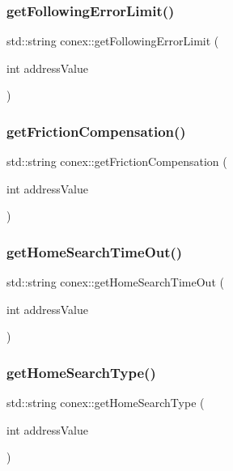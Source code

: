 \subsubsection{\texorpdfstring{get\+Following\+Error\+Limit()}{getFollowingErrorLimit()}}
{\footnotesize\ttfamily std\+::string conex\+::get\+Following\+Error\+Limit (\begin{DoxyParamCaption}\item[{int}]{address\+Value }\end{DoxyParamCaption})}

\mbox{\label{namespaceconex_afaa116b8274daffbd23139bb930596f9}} 
\subsubsection{\texorpdfstring{get\+Friction\+Compensation()}{getFrictionCompensation()}}
{\footnotesize\ttfamily std\+::string conex\+::get\+Friction\+Compensation (\begin{DoxyParamCaption}\item[{int}]{address\+Value }\end{DoxyParamCaption})}

\mbox{\label{namespaceconex_a5652c22cdfb236799111449461eb88f5}} 
\subsubsection{\texorpdfstring{get\+Home\+Search\+Time\+Out()}{getHomeSearchTimeOut()}}
{\footnotesize\ttfamily std\+::string conex\+::get\+Home\+Search\+Time\+Out (\begin{DoxyParamCaption}\item[{int}]{address\+Value }\end{DoxyParamCaption})}

\mbox{\label{namespaceconex_ad1b0c2c8ee173f299589772d4c2fd3b2}} 
\subsubsection{\texorpdfstring{get\+Home\+Search\+Type()}{getHomeSearchType()}}
{\footnotesize\ttfamily std\+::string conex\+::get\+Home\+Search\+Type (\begin{DoxyParamCaption}\item[{int}]{address\+Value }\end{DoxyParamCaption})}

